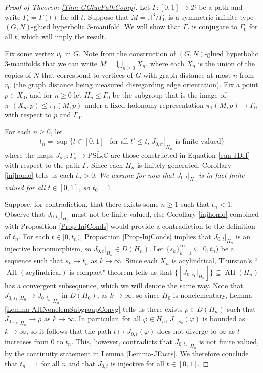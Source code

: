 \documentclass[11pt,leqno]{article}
\DeclareMathOperator{\AH}{AH}
\theoremstyle{introdef}
\numberwithin{lemma}{section}
\theoremstyle{definition}
\newcommand{\C}{\mathbb{C}}
\begin{document}
\begin{proof}[Proof of Theorem \ref{Thm-GGluePathComp}]
    Let $\Gamma:[0,1]\rightarrow\mathcal{D}$ be a path and write $\Gamma_t=\Gamma(t)$ for all $t$. Suppose that $M=\mathbb{H}^3/\Gamma_0$ is a symmetric infinite type $(G,N)$-glued hyperbolic $3$-manifold. We will show that $\Gamma_t$ is conjugate to $\Gamma_0$ for all $t$, which will imply the result.\par

    Fix some vertex $v_0$ in $G$. Note from the construction of $(G,N)$-glued hyperbolic $3$-manifolds that we can write $M=\bigcup_{n\geq 0} X_n$, where each $X_n$ is the union of the copies of $N$ that correspond to vertices of $G$ with graph distance at most $n$ from $v_0$ (the graph distance being measured disregarding edge orientation). Fix a point $p\in X_0$, and for $n\geq 0$ let $H_n\leq \Gamma_0$ be the subgroup that is the image of $\pi_1(X_n,p)\leq \pi_1(M,p)$ under a fixed holonomy representation $\pi_1(M,p)\rightarrow \Gamma_0$ with respect to $p$ and $\Gamma_0$.\par

     For each $n\geq0$, let \[t_n=\sup\{t\in[0,1]\;|\; \text{for all }t'\leq t\text{, }J_{0,t'}|_{H_n}\text{ is finite valued}\}\] where the maps $J_{s,t}:\Gamma_s\rightarrow\overline{\mathrm{PSL}_2\C}$ are those constructed in Equation \ref{eqn-JDef} with respect to the path $\Gamma$. Since each $H_n$ is finitely generated, Corollary \ref{injhomo} tells us each $t_n>0$. \textit{We assume for now that $J_{0,t}|_{H_0}$ is in fact finite valued for all $t\in[0,1]$, so $t_0=1$.}\par

     Suppose, for contradiction, that there exists some $n\geq 1$ such that $t_n<1$. Observe that $J_{0,t_n}|_{H_n}$ must not be finite valued, else Corollary \ref{injhomo} combined with Proposition \ref{Prop-InjConds} would provide a contradiction to the definition of $t_n$. For each $t\in[0,t_n)$, Proposition \ref{Prop-InjConds} implies that $J_{0,t}|_{H_n}$ is an injective homomorphism, so  $J_{0,t}|_{H_n}\in D(H_n)$. Let $\{s_k\}_{k=1}^\infty\subseteq[0,t_n)$ be a sequence such that $s_k\rightarrow t_n$ as $k\rightarrow\infty$. Since each $X_n$ is acylindrical, Thurston's ``$\AH(\text{acylindrical})$ is compact" theorem \cite{THUI} tells us that $\{[J_{0,s_k}|_{H_n}]\}\subseteq \AH(H_n)$ has a convergent subsequence, which we will denote the same way. Note that $J_{0,s_k}|_{H_0}\rightarrow J_{0,t_n}|_{H_0}$ in $D(H_0)$, as $k\rightarrow\infty$, so since $H_0$ is nonelementary, Lemma \ref{Lemma-AHNonelemSubgroupConvg} tells us there exists $\rho\in D(H_n)$ such that $J_{0,s_k}|_{H_n}\rightarrow\rho$ as $k\rightarrow\infty$. In particular, for all $\varphi\in H_n$, $J_{0,s_k}(\varphi)$ is bounded as $k\rightarrow\infty$, so it follows that the path $t\mapsto J_{0,t}(\varphi)$ does not diverge to $\infty$ as $t$ increases from $0$ to $t_n$. This, however, contradicts that $J_{0,t_n}|_{H_n}$ is not finite valued, by the continuity statement in Lemma \ref{Lemma-JFacts}. We therefore conclude that $t_n=1$ for all $n$ and that $J_{0,t}$ is injective for all $t\in[0,1]$.\par


\end{proof}
\end{document}
